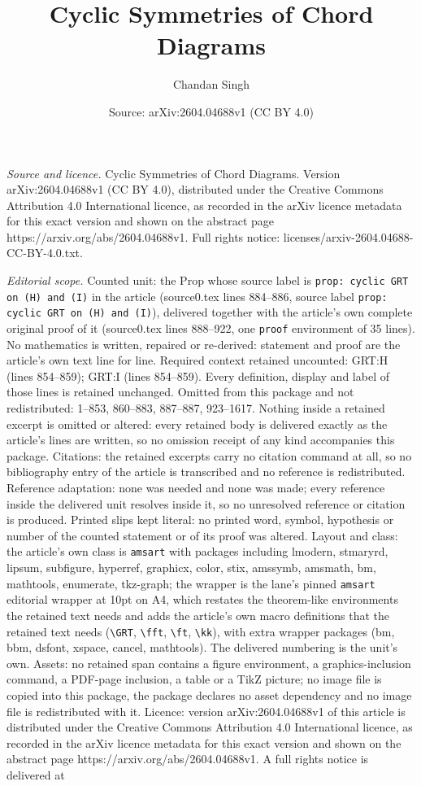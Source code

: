 \documentclass[10pt,a4paper]{amsart}
\title[Cyclic Symmetries of Chord Diagrams]{Cyclic Symmetries of Chord Diagrams}
\author{Chandan Singh}
\date{Source: arXiv:2604.04688v1 (CC BY 4.0)}
\begin{document}
\maketitle

\noindent\emph{Source and licence.} Cyclic Symmetries of Chord Diagrams. Version arXiv:2604.04688v1 (CC BY 4.0), distributed under the Creative Commons Attribution 4.0 International licence, as recorded in the arXiv licence metadata for this exact version and shown on the abstract page https://arxiv.org/abs/2604.04688v1. Full rights notice: licenses/arxiv-2604.04688-CC-BY-4.0.txt.\par\smallskip

\noindent\textit{Editorial scope.} Counted unit: the Prop whose source label is \texttt{prop: cyclic GRT on (H) and (I)} in the article (source0.tex lines 884--886, source label \texttt{prop: cyclic GRT on (H) and (I)}), delivered together with the article's own complete original proof of it (source0.tex lines 888--922, one \texttt{proof} environment of 35 lines). No mathematics is written, repaired or re-derived: statement and proof are the article's own text line for line. Required context retained uncounted: GRT:H (lines 854--859); GRT:I (lines 854--859). Every definition, display and label of those lines is retained unchanged. Omitted from this package and not redistributed: 1--853, 860--883, 887--887, 923--1617. Nothing inside a retained excerpt is omitted or altered: every retained body is delivered exactly as the article's lines are written, so no omission receipt of any kind accompanies this package. Citations: the retained excerpts carry no citation command at all, so no bibliography entry of the article is transcribed and no reference is redistributed. Reference adaptation: none was needed and none was made; every reference inside the delivered unit resolves inside it, so no unresolved reference or citation is produced. Printed slips kept literal: no printed word, symbol, hypothesis or number of the counted statement or of its proof was altered. Layout and class: the article's own class is \texttt{amsart} with packages including lmodern, stmaryrd, lipsum, subfigure, hyperref, graphicx, color, stix, amssymb, amsmath, bm, mathtools, enumerate, tkz-graph; the wrapper is the lane's pinned \texttt{amsart} editorial wrapper at 10pt on A4, which restates the theorem-like environments the retained text needs and adds the article's own macro definitions that the retained text needs (\texttt{\textbackslash GRT}, \texttt{\textbackslash fft}, \texttt{\textbackslash ft}, \texttt{\textbackslash kk}), with extra wrapper packages (bm, bbm, dsfont, xspace, cancel, mathtools). The delivered numbering is the unit's own. Assets: no retained span contains a figure environment, a graphics-inclusion command, a PDF-page inclusion, a table or a TikZ picture; no image file is copied into this package, the package declares no asset dependency and no image file is redistributed with it. Licence: version arXiv:2604.04688v1 of this article is distributed under the Creative Commons Attribution 4.0 International licence, as recorded in the arXiv licence metadata for this exact version and shown on the abstract page https://arxiv.org/abs/2604.04688v1. A full rights notice is delivered at 
\end{document}
